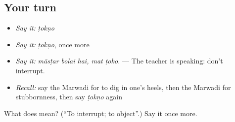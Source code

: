\subsection*{Your turn}
\begin{itemize}
\raggedright
  \item \emph{Say it:} \emph{ṭokṇo}
  \item \emph{Say it:} \emph{ṭokṇo}, once more
  \item \emph{Say it:} \emph{māsṭar bolai hai, mat ṭoko.} — The teacher is speaking: don't interrupt.
  \item \emph{Recall:} say the Marwadi for to dig in one's heels, then the Marwadi for stubbornness, then say \emph{ṭokṇo} again
\end{itemize}

\begin{tcolorbox}[breakable,colback=teal!4,colframe=teal!35!black,title={Before you move on}]
What does  mean? (\textquotedblleft{}To interrupt; to object\textquotedblright{}.) Say it once more.
\end{tcolorbox}

